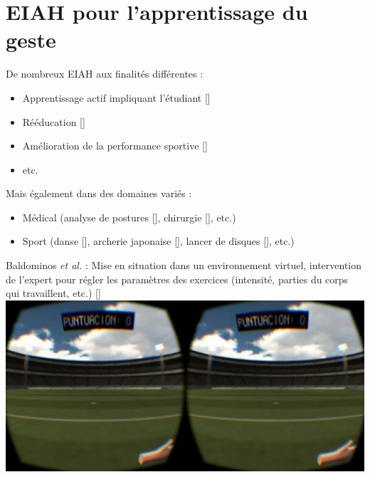\documentclass[svgnames]{beamer}
\newcommand{\mycite}[1]{[\textit{\cite{#1}}]}
\begin{document}
	\section{EIAH pour l'apprentissage du geste}
	\begin{frame}{\secname}
		De nombreux EIAH aux finalités différentes :
		\begin{itemize}[label=$\bullet$]
			\item Apprentissage actif impliquant l'étudiant \mycite{Xu2019Ptt}
			\item Rééducation \mycite{Alankus2010TCG}
			\item Amélioration de la performance sportive \mycite{Baldominos2015AAt}
			\item etc.
		\end{itemize}
		
		Mais également dans des domaines variés :
		\begin{itemize}[label=$\bullet$]
			\item Médical (analyse de postures \mycite{Aminian2004Chm}, chirurgie \mycite{BMT_2015}, etc.)
			\item Sport (danse \mycite{Maes2012DtM}, archerie japonaise \mycite{Yoshinaga2015Doa}, lancer de disques \mycite{YAMAOKA2013912}, etc.)
		\end{itemize}
	\end{frame}
	
	\begin{frame}{\secname}
		Baldominos \textit{et al.} : Mise en situation dans un environnement virtuel, intervention de l'expert pour régler les paramètres des exercices (intensité, parties du corps qui travaillent, etc.) \mycite{Baldominos2015AAt}\\
		\centering
		\includegraphics[scale=0.5]{img/eiah_baldominos.png}
	\end{frame}
	
\end{document}
